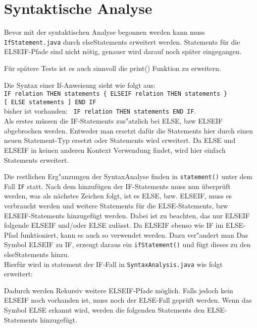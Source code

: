 \section{Syntaktische Analyse}
Bevor mit der syntaktischen Analyse begonnen werden kann muss  \verb|IfStatement.java|
durch elseStatements erweitert werden. Statements für die ELSEIF-Pfade sind nicht nötig, genauer wird darauf noch später eingegangen.

Für spätere Tests ist es auch sinnvoll die print() Funktion zu erweitern.

\vspace{3mm}
Die Syntax einer If-Anweisung sieht wie folgt aus:\\ \verb|IF relation THEN statements { ELSEIF relation THEN statements }|\\
\verb|[ ELSE statements ] END IF|\\  bisher ist vorhanden: \verb| IF relation THEN statements END IF|.\\
Als erstes müssen die IF-Statements zus"atzlich bei ELSE, bzw ELSEIF abgebrochen werden.
Entweder man ersetzt dafür die Statements hier durch einen neuen Statement-Typ ersetzt oder Statements wird erweitert.
Da  ELSE und ELSEIF in keinen anderen Kontext Verwendung findet, wird hier einfach Statements erweitert.

Die restlichen Erg"anzungen der SyntaxAnalyse finden in \verb|statement()| unter dem Fall \verb|IF| statt.
Nach dem hinzufügen der IF-Statements muss nun überprüft werden, was als nächstes Zeichen folgt, ist es ELSE, bzw. ELSEIF, muss es verbraucht werden und weitere Statements für die ELSE-Statements, bzw ELSEIF-Statements hinzugefügt werden.
Dabei ist zu beachten, das nur ELSEIF folgende ELSEIF und/oder ELSE zulässt.
Da ELSEIF ebenso wie IF im ELSE-Pfad funktioniert, kann es auch so verwendet werden.
Dazu ver"andert man Das Symbol ELSEIF zu IF, erzeugt daraus ein \verb|ifStatement()| und fügt dieses zu den elseStatements hinzu.\\  Hierfür wird in statement der IF-Fall in \verb|SyntaxAnalysis.java| wie folgt erweitert:

Dadurch werden Rekursiv weitere ELSEIF-Pfade möglich.	
Falls jedoch kein ELSEIF noch vorhanden ist, muss noch der ELSE-Fall geprüft werden.
Wenn das Symbol ELSE erkannt wird, werden die folgenden Statements den ELSE-Statements hinzugefügt.


